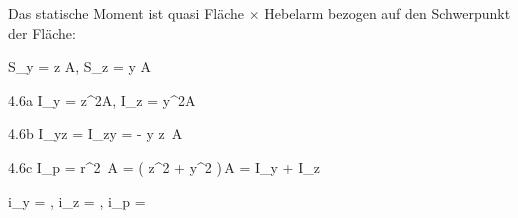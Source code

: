\documentclass[11pt]{article}
\newcommand{\1}{ {\mathds{1}} }
\begin{document}
\begin{multicols}{3}
		Das statische Moment ist quasi Fläche $\times$ Hebelarm bezogen auf den Schwerpunkt der Fläche:\\\nopagebreak
		\begin{formel}{4.5}
			S_y
			=
			\int z  A, \quad
			S_z
			=
			\int y  A
		\end{formel}
		\begin{formel}{4.6a}
			I_y
			=
			\int
			z^2A, \quad
			I_z
			=
			\int
			y^2A
		\end{formel}
		\nopagebreak
		\begin{formel}{4.6b}
			I_{yz} = I_{zy} = -\!\int\! y z\, A
		\end{formel}
		\nopagebreak
		\begin{formel}{4.6c}
			I_p = \int r^2 \,A = \int\! \left( z^2 + y^2  \right)\,A = I_y + I_z
		\end{formel}
		\begin{formel}{4.7}
			i_y = , \quad 
			i_z = , \quad
			i_p = 
		\end{formel}


\end{multicols}
\end{document}
